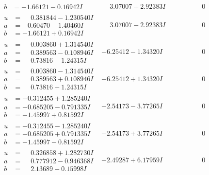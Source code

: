 \documentclass[1p]{elsarticle_modified}
\theoremstyle{definition}
\begin{document}
$$\begin{array}{c|c|c}
\begin{aligned}
b &= -1.66121 - 0.16942 I\end{aligned}
 & \phantom{-}3.07007 + 2.92383 I & \phantom{-0.000000 } 0 \\ \hline\begin{aligned}
u &= \phantom{-}0.381844 - 1.230540 I \\
a &= -0.60470 - 1.40460 I \\
b &= -1.66121 + 0.16942 I\end{aligned}
 & \phantom{-}3.07007 - 2.92383 I & \phantom{-0.000000 } 0 \\ \hline\begin{aligned}
u &= \phantom{-}0.003860 + 1.314540 I \\
a &= \phantom{-}0.389563 - 0.108946 I \\
b &= \phantom{-}0.73816 - 1.24315 I\end{aligned}
 & -6.25412 - 1.34320 I & \phantom{-0.000000 } 0 \\ \hline\begin{aligned}
u &= \phantom{-}0.003860 - 1.314540 I \\
a &= \phantom{-}0.389563 + 0.108946 I \\
b &= \phantom{-}0.73816 + 1.24315 I\end{aligned}
 & -6.25412 + 1.34320 I & \phantom{-0.000000 } 0 \\ \hline\begin{aligned}
u &= -0.312455 + 1.285240 I \\
a &= -0.685205 - 0.791335 I \\
b &= -1.45997 + 0.81592 I\end{aligned}
 & -2.54173 - 3.77265 I & \phantom{-0.000000 } 0 \\ \hline\begin{aligned}
u &= -0.312455 - 1.285240 I \\
a &= -0.685205 + 0.791335 I \\
b &= -1.45997 - 0.81592 I\end{aligned}
 & -2.54173 + 3.77265 I & \phantom{-0.000000 } 0 \\ \hline\begin{aligned}
u &= \phantom{-}0.326858 + 1.282730 I \\
a &= \phantom{-}0.777912 - 0.946368 I \\
b &= \phantom{-}2.13689 - 0.15998 I\end{aligned}
 & -2.49287 + 6.17959 I & \phantom{-0.000000 } 0 \\ \hline\begin{aligned}

\end{aligned}
\end{array}$$
\end{document}
